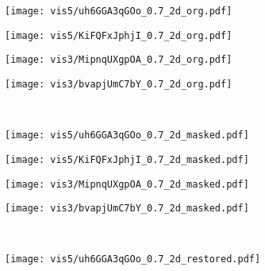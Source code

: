 \documentclass{article}
\begin{document}
{\begin{figure}[h!]
    
\begin{subfigure}[b]{0.245\linewidth}
        \texttt{[image: vis5/uh6GGA3qGOo\_0.7\_2d\_org.pdf]}
    \end{subfigure}    
    \begin{subfigure}[b]{0.245\linewidth}
        \texttt{[image: vis5/KiFQFxJphjI\_0.7\_2d\_org.pdf]}
    \end{subfigure}     
    \begin{subfigure}[b]{0.245\linewidth}
        \texttt{[image: vis3/MipnqUXgpOA\_0.7\_2d\_org.pdf]}
    \end{subfigure}
    \begin{subfigure}[b]{0.245\linewidth}
        \texttt{[image: vis3/bvapjUmC7bY\_0.7\_2d\_org.pdf]}
    \end{subfigure}   
    \\
    \begin{subfigure}[b]{0.245\linewidth}
        \texttt{[image: vis5/uh6GGA3qGOo\_0.7\_2d\_masked.pdf]}
    \end{subfigure}    
    \begin{subfigure}[b]{0.245\linewidth}
        \texttt{[image: vis5/KiFQFxJphjI\_0.7\_2d\_masked.pdf]}
    \end{subfigure}      
    \begin{subfigure}[b]{0.245\linewidth}
        \texttt{[image: vis3/MipnqUXgpOA\_0.7\_2d\_masked.pdf]}
    \end{subfigure}
    \begin{subfigure}[b]{0.245\linewidth}
        \texttt{[image: vis3/bvapjUmC7bY\_0.7\_2d\_masked.pdf]}
    \end{subfigure}
    \\
    \begin{subfigure}[b]{0.245\linewidth}
        \texttt{[image: vis5/uh6GGA3qGOo\_0.7\_2d\_restored.pdf]}
        

\end{subfigure}
\end{figure}}
\end{document}
